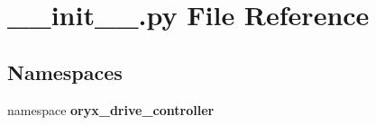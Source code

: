 \section{\-\_\-\-\_\-init\-\_\-\-\_\-.\-py \-File \-Reference}
\label{____init_____8py}
\subsection*{\-Namespaces}
\begin{DoxyCompactItemize}
\item 
namespace {\bf oryx\-\_\-drive\-\_\-controller}
\end{DoxyCompactItemize}

